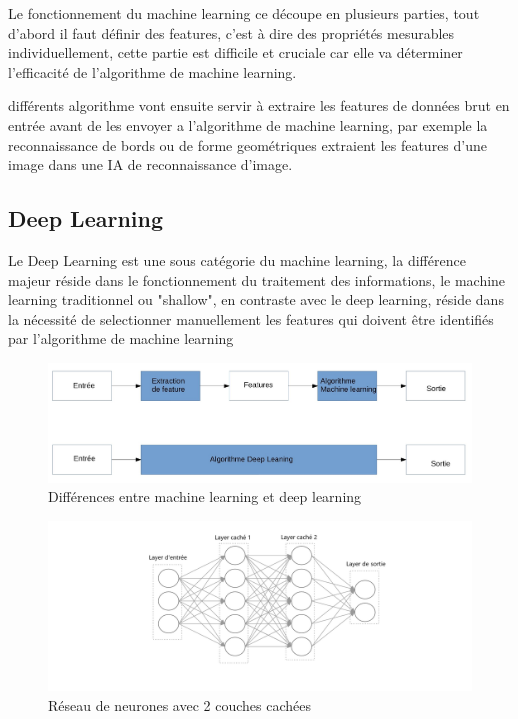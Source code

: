 Le fonctionnement du machine learning ce découpe en plusieurs parties,
tout d'abord il faut définir des features, c'est à dire des
propriétés mesurables individuellement, cette partie est difficile et cruciale
car elle va déterminer l'efficacité de l'algorithme de machine learning. \newline

différents algorithme vont ensuite servir à extraire les features de données 
brut en entrée avant de les envoyer a l'algorithme de machine learning, par exemple 
la reconnaissance de bords ou de forme geométriques extraient les features d'une 
image dans une IA de reconnaissance d'image. \newline 


\subsection{Deep Learning}
Le Deep Learning est une sous catégorie du machine learning, 
la différence majeur réside dans le fonctionnement du traitement des 
informations, le machine learning traditionnel ou "shallow", en contraste avec le deep learning,
réside dans la nécessité de selectionner manuellement les features qui doivent être 
identifiés par l'algorithme de machine learning

\begin{figure}[!h]
    \centering
    \includegraphics[width=1\textwidth]{Images/MLvsDL}
    \caption{Différences entre machine learning et deep learning}
	\label{fig:categorieIA}
\end{figure}



\newpage
\begin{figure}[!h]
    \centering
    \includegraphics[width=1\textwidth]{Images/feedforward-nn}
    \caption{Réseau de neurones avec 2 couches cachées}
	\label{fig:categorieIA}
\end{figure}

